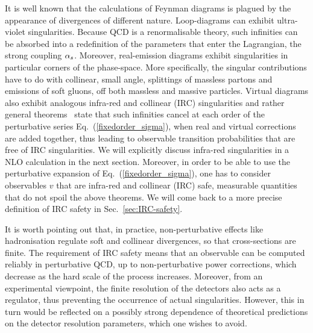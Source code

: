 %
It is well known that the calculations of Feynman diagrams is plagued by the appearance of divergences of different nature. 
%
Loop-diagrams can exhibit ultra-violet singularities. Because QCD is a renormalisable theory, such infinities can be absorbed into a redefinition of the parameters that enter the Lagrangian, \eg the strong coupling $\alpha_s$.
%
Moreover, real-emission diagrams exhibit singularities in particular
corners of the phase-space. More specifically, the singular
contributions have to do with collinear, \ie small angle, splittings
of massless partons and emissions of soft gluons, off both massless and
massive particles. Virtual diagrams also exhibit analogous infra-red
and collinear (IRC) singularities and rather general
theorems~\cite{Blochnordsieck,Kinoshita,Lee} state that such
infinities cancel at each order of the perturbative series Eq.~(\ref{fixedorder_sigma}), when real and virtual corrections are added together, thus leading to observable transition probabilities that are free of IRC singularities.
%
We will explicitly discuss infra-red singularities in a NLO calculation in the next section.
%
Moreover, in order to be able to use the perturbative expansion of
Eq.~(\ref{fixedorder_sigma}), one has to consider observables
$v$ that are infra-red and collinear (IRC) safe, \ie measurable quantities that do not spoil the above theorems. We will come back to a more precise definition of IRC safety in Sec.~\ref{sec:IRC-safety}.

It is worth pointing out that, in
  practice, non-perturbative effects like hadronisation regulate
  soft and collinear divergences, so that cross-sections are
  finite. The requirement of IRC safety means that an observable can
  be computed reliably in perturbative QCD, up to non-perturbative
  power corrections, which decrease as the hard scale of the process increases.
  Moreover, from an
  experimental viewpoint, the finite resolution of the detectors also acts
as a regulator, thus preventing the occurrence of actual
singularities. However, this in turn would be reflected on a possibly
strong dependence of theoretical predictions on the detector
resolution parameters, which one wishes to avoid.


